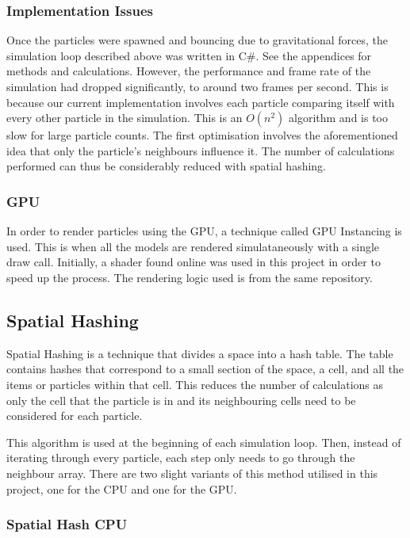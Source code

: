 \documentclass[12pt]{article}
\begin{document}
    \subsubsection{Implementation Issues}

    Once the particles were spawned and bouncing due to gravitational forces, the simulation loop described above was written in C\#. See the appendices for methods and calculations. However, the performance and frame rate of the simulation had dropped significantly, to around two frames per second. This is because our current implementation involves each particle comparing itself with every other particle in the simulation. This is an $O(n^2)$ algorithm and is too slow for large particle counts. The first optimisation involves the aforementioned idea that only the particle's neighbours influence it. The number of calculations performed can thus be considerably reduced with spatial hashing.

    \subsubsection{GPU}

    In order to render particles using the GPU, a technique called GPU Instancing is used. This is when all the models are rendered simulataneously with a single draw call. Initially, a shader found online was used in this project in order to speed up the process\cite{gpuinstanceshader}. The rendering logic used is from the same repository.

    \subsection{Spatial Hashing}

    Spatial Hashing is a technique that divides a space into a hash table. The table contains hashes that correspond to a small section of the space, a cell, and all the items or particles within that cell\cite{spatialpython}. This reduces the number of calculations as only the cell that the particle is in and its neighbouring cells need to be considered for each particle. 
    
    This algorithm is used at the beginning of each simulation loop. Then, instead of iterating through every particle, each step only needs to go through the neighbour array. There are two slight variants of this method utilised in this project, one for the CPU and one for the GPU.

    \subsubsection{Spatial Hash CPU}
\end{document}
